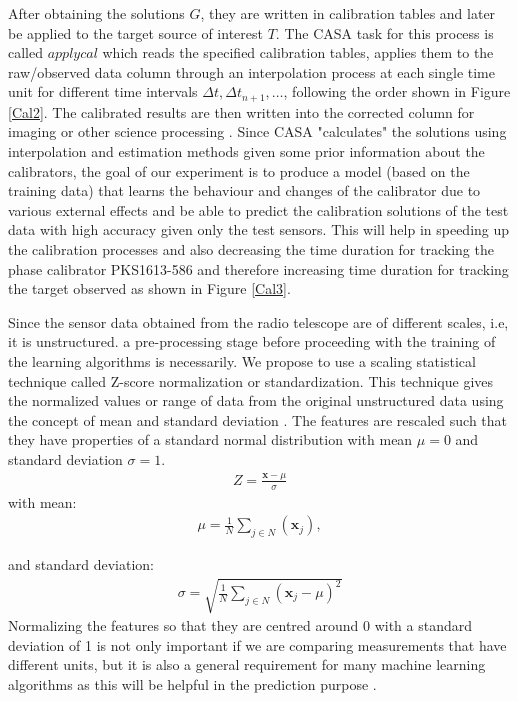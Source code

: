  
After obtaining the solutions $G$, they are written in calibration tables and later be applied to the target source of interest $T$. The CASA task for this process is called $\textit{applycal}$ which reads the specified calibration tables, applies them to the raw/observed data column through an interpolation process at each single time unit for different time intervals $\Delta t, \Delta t_{n+1},\dots$, following the order shown in Figure \ref{Cal2}. The calibrated results are then written into the corrected column for imaging or other science processing \citep{ott2013casa}. Since CASA "calculates" the solutions using interpolation and estimation methods given some prior information about the calibrators, the goal of our experiment is to produce a model (based on the training data) that learns the behaviour and changes of the calibrator due to various external effects and be able to predict the calibration solutions of the test data with high accuracy given only the test sensors. This will help in speeding up the calibration processes and also decreasing the time duration for tracking the phase calibrator PKS1613-586 and therefore increasing time duration for tracking the target observed as shown in Figure \ref{Cal3}. 

Since the sensor data obtained from the radio telescope are of different scales, i.e, it is unstructured. a pre-processing stage before proceeding with the training of the learning algorithms is necessarily. We propose to use a scaling statistical technique called Z-score normalization or standardization. This technique gives the normalized values or range of data from the original unstructured data using the concept of mean and standard deviation \citep{patro2015normalization}. The features are rescaled such that they have properties of a standard normal distribution with mean $\mu=0$ and standard deviation $\sigma=1$. 
\begin{align}
Z=\frac{\textbf{x}- \mu}{\sigma}
\end{align}
with mean:
\begin{align*}
\mu= \frac{1}{N} \sum_{j\in N} (\textbf{x}_j),
\end{align*}

and standard deviation:
\begin{align*}
\sigma=\sqrt{ \frac{1}{N} \sum_{j\in N} (\textbf{x}_j-\mu )^2}
\end{align*}
Normalizing the features so that they are centred around 0 with a standard deviation of 1 is not only important if we are comparing measurements that have different units, but it is also a general requirement for many machine learning algorithms as this will be helpful in the prediction purpose \citep{bott2014feature}.

